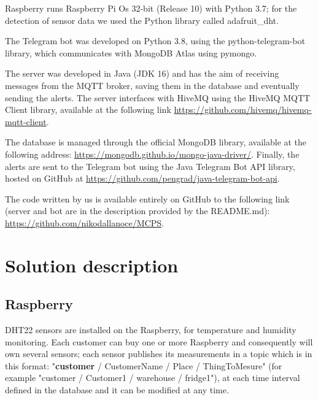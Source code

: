 Raspberry runs Raspberry Pi Os 32-bit (Release 10) with Python 3.7; for the detection of sensor data we used the Python library called adafruit\_dht.\vspace{3mm}

The Telegram bot was developed on Python 3.8, using the python-telegram-bot library, which communicates with MongoDB Atlas using pymongo.
\vspace{3mm}

The server was developed in Java (JDK 16) and has the aim of receiving messages from the MQTT broker, saving them in the database and eventually sending the alerts. The server interfaces with HiveMQ using the HiveMQ MQTT Client library, available at the following link \url{https://github.com/hivemq/hivemq-mqtt-client}. 

The database is managed through the official MongoDB library, available at the following address: \url{https://mongodb.github.io/mongo-java-driver/}. Finally, the alerts are sent to the Telegram bot using the Java Telegram Bot API library, hosted on GitHub at \url{https://github.com/pengrad/java-telegram-bot-api}.
\vspace{3mm}

The code written by us is available entirely on GitHub to the following link (server and bot are in the description provided by the README.md): \url{https://github.com/nikodallanoce/MCPS}.

\section{Solution description}

\subsection{Raspberry}
DHT22 sensors are installed on the Raspberry, for temperature and humidity monitoring. Each customer can buy one or more Raspberry and consequently will own several sensors; each sensor publishes its measurements in a topic which is in this format: "\textbf{customer} / CustomerName / Place / ThingToMesure" (for example "customer / Customer1 / warehouse / fridge1"), at each time interval defined in the database and it can be modified at any time.
\vspace{3mm}

